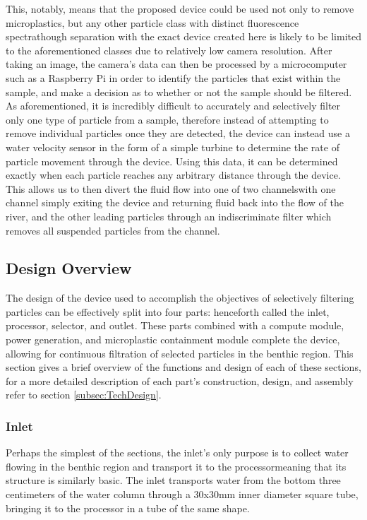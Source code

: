 \documentclass[fleqn,10pt]{SelfArx} %
\begin{document}
	This, notably, means that the proposed device could be used not only to remove microplastics, but any other particle class with distinct fluorescence spectra\textemdash though separation with the exact device created here is likely to be limited to the aforementioned classes due to relatively low camera resolution. After taking an image, the camera’s data can then be processed by a microcomputer such as a Raspberry Pi in order to identify the particles that exist within the sample, and make a decision as to whether or not the sample should be filtered. As aforementioned, it is incredibly difficult to accurately and selectively filter only one type of particle from a sample, therefore instead of attempting to remove individual particles once they are detected, the device can instead use a water velocity sensor in the form of a simple turbine to determine the rate of particle movement through the device. Using this data, it can be determined exactly when each particle reaches any arbitrary distance through the device. This allows us to then divert the fluid flow into one of two channels\textemdash with one channel simply exiting the device and returning fluid back into the flow of the river, and the other leading particles through an indiscriminate filter which removes all suspended particles from the channel. 
	
	\subsection{Design Overview}
	The design of the device used to accomplish the objectives of selectively filtering particles can be effectively split into four parts: henceforth called the inlet, processor, selector, and outlet. These parts combined with a compute module, power generation, and microplastic containment module complete the device, allowing for continuous filtration of selected particles in the benthic region. This section gives a brief overview of the functions and design of each of these sections, for a more detailed description of each part’s construction, design, and assembly refer to  section \ref{subsec:TechDesign}.
	
	\subsubsection{Inlet}
	Perhaps the simplest of the sections, the inlet’s only purpose is to collect water flowing in the benthic region and transport it to the processor\textemdash meaning that its structure is similarly basic. The inlet transports water from the bottom three centimeters of the water column through a 30x30mm inner diameter square tube, bringing it to the processor in a tube of the same shape.
	
\end{document}
